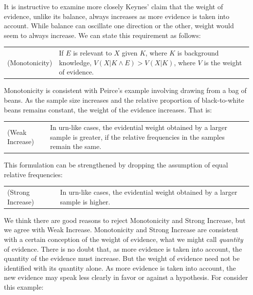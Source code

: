 \documentclass[
  10pt,
  dvipsnames,enabledeprecatedfontcommands]{scrartcl}
\begin{document}
It is instructive to examine more closely Keynes' claim that the weight
of evidence, unlike its balance, always increases as more evidence is
taken into account. While balance can oscillate one direction or the
other, weight would seem to always increase. We can state this
requirement as follows:

\vspace{1mm}
\begin{tabular}{lp{9cm}}
(Monotonicity) & If $E$ is relevant to $X$ given $K$, where $K$ is background knowledge, $V(X\vert K \wedge E) > V(X\vert K)$, where $V$ is the weight of evidence.
\end{tabular}
\vspace{1mm}

\noindent Monotonicity is consistent with Peirce's example involving
drawing from a bag of beans. As the sample size increases and the
relative proportion of black-to-white beans remains constant, the weight
of the evidence increases. That is:

\vspace{1mm}
\begin{tabular}{p{3cm}p{10cm}}
(Weak Increase) & In urn-like cases, the evidential weight obtained by a larger sample is greater, if the relative frequencies in the samples remain the same.
\end{tabular}
\vspace{1mm}

\noindent This formulation can be strengthened by dropping the
assumption of equal relative frequencies:

\vspace{1mm}
\begin{tabular}{p{3cm}p{10cm}}
(Strong Increase) & In urn-like cases, the evidential weight obtained by a larger sample is higher.
\end{tabular}

\vspace{1mm}

\noindent We think there are good reasons to reject Monotonicity and
Strong Increase, but we agree with Weak Increase. Monotonicity and
Strong Increase are consistent with a certain conception of the weight
of evidence, what we might call \emph{quantity} of evidence. There is no
doubt that, as more evidence is taken into account, the quantity of the
evidence must increase. But the weight of evidence need not be
identified with its quantity alone. As more evidence is taken into
account, the new evidence may speak less clearly in favor or against a
hypothesis. For consider this example:
\end{document}
